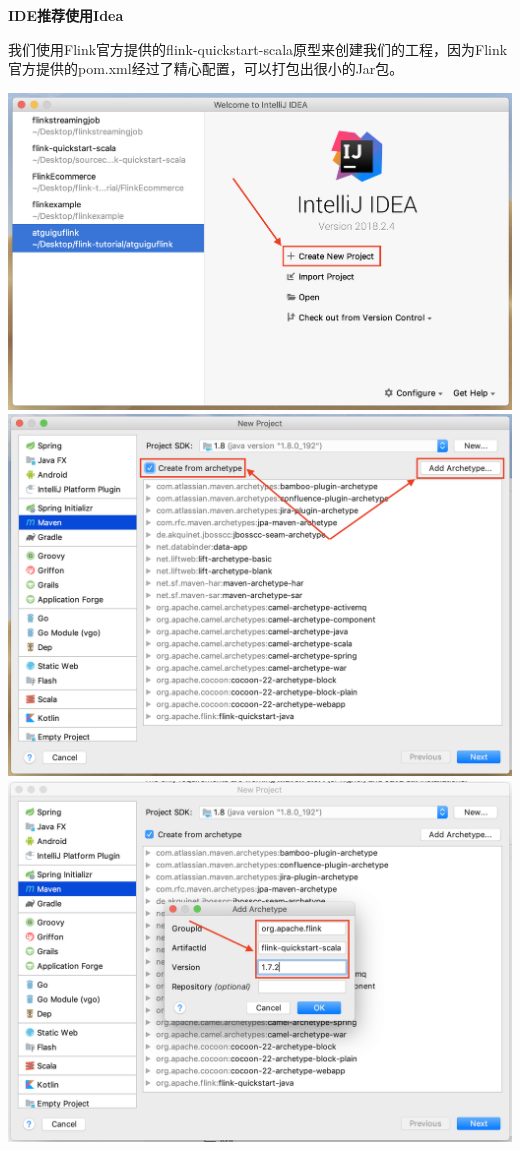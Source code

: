 \documentclass[oneside]{ctexbook}
\begin{document}
\textbf{IDE推荐使用Idea}

我们使用Flink官方提供的flink-quickstart-scala原型来创建我们的工程，因为Flink官方提供的pom.xml经过了精心配置，可以打包出很小的Jar包。

\noindent \includegraphics[width=\textwidth]{quickstart1.png}
\noindent \includegraphics[width=\textwidth]{quickstart2.png}
\noindent \includegraphics[width=\textwidth]{quickstart3.png}
\end{document}
